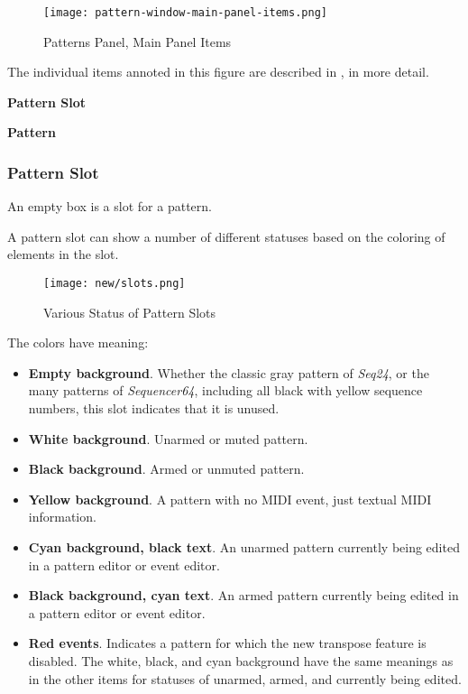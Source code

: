 \begin{figure}[H]
   \centering 
   \texttt{[image: pattern-window-main-panel-items.png]}
   \caption{Patterns Panel, Main Panel Items}
   \label{fig:pattern_window_main_panel_items}
\end{figure}

   The individual items annoted in this figure are described in
   , in more detail.

   \begin{enumber}
      \item \textbf{Pattern Slot}
      \item \textbf{Pattern}
   \end{enumber}

\subsubsection{Pattern Slot}
\label{subsubsec:seq64_patterns_pattern_slot}

   An empty box is a slot for a pattern.

   A pattern slot can show a number of different statuses based on the coloring
   of elements in the slot. 

\begin{figure}[H]
   \centering 
   \texttt{[image: new/slots.png]}
   \caption{Various Status of Pattern Slots}
   \label{fig:pattern_slots_statuses}
\end{figure}

   The colors have meaning:

   \begin{itemize}
      \item \textbf{Empty background}.  Whether the classic gray pattern
         of \textsl{Seq24}, or the many patterns of \textsl{Sequencer64},
         including all black with yellow sequence numbers, this
         slot indicates that it is unused.
      \item \textbf{White background}.  Unarmed or muted pattern.
      \item \textbf{Black background}.  Armed or unmuted pattern.
      \item \textbf{Yellow background}.  A pattern with no MIDI event, just
         textual MIDI information.
      \item \textbf{Cyan background, black text}.
         An unarmed pattern currently being edited in a pattern editor or event
         editor.
      \item \textbf{Black background, cyan text}.
         An armed pattern currently being edited in a pattern editor or event
         editor.
      \item \textbf{Red events}.
         Indicates a pattern for which the new transpose feature is
         disabled.  The white, black, and cyan background have the same
         meanings as in the other items for statuses of unarmed, armed, and
         currently being edited.
   \end{itemize}

